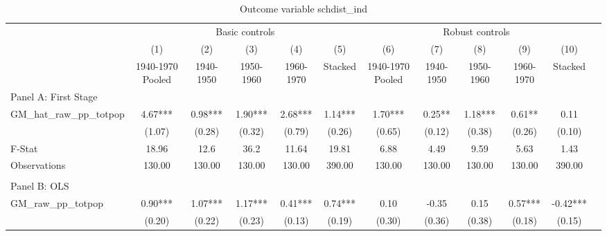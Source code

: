  \begin{table}[htbp]\centering {} \begin{threeparttable} \caption{Outcome variable schdist\_ind } \begin{tabular}{l*{11}{c}} \toprule
          &\multicolumn{5}{c}{Basic controls}                                   &\multicolumn{5}{c}{Robust controls}                                  \\\cmidrule(lr){2-6}\cmidrule(lr){7-11}
          &\multicolumn{1}{c}{(1)}&\multicolumn{1}{c}{(2)}&\multicolumn{1}{c}{(3)}&\multicolumn{1}{c}{(4)}&\multicolumn{1}{c}{(5)}&\multicolumn{1}{c}{(6)}&\multicolumn{1}{c}{(7)}&\multicolumn{1}{c}{(8)}&\multicolumn{1}{c}{(9)}&\multicolumn{1}{c}{(10)}\\
          &\multicolumn{1}{c}{1940-1970 Pooled}&\multicolumn{1}{c}{1940-1950}&\multicolumn{1}{c}{1950-1960}&\multicolumn{1}{c}{1960-1970}&\multicolumn{1}{c}{Stacked}&\multicolumn{1}{c}{1940-1970 Pooled}&\multicolumn{1}{c}{1940-1950}&\multicolumn{1}{c}{1950-1960}&\multicolumn{1}{c}{1960-1970}&\multicolumn{1}{c}{Stacked}\\
\cmidrule(lr){1-11}
\multicolumn{10}{l}{Panel A: First Stage}\\
\cmidrule(lr){1-11}
GM\_hat\_raw\_pp\_totpop&      4.67***&      0.98***&      1.90***&      2.68***&      1.14***&      1.70***&      0.25** &      1.18***&      0.61** &      0.11   \\
          &    (1.07)   &    (0.28)   &    (0.32)   &    (0.79)   &    (0.26)   &    (0.65)   &    (0.12)   &    (0.38)   &    (0.26)   &    (0.10)   \\
\midrule
F-Stat    &     18.96   &      12.6   &      36.2   &     11.64   &     19.81   &      6.88   &      4.49   &      9.59   &      5.63   &      1.43   \\
Observations&    130.00   &    130.00   &    130.00   &    130.00   &    390.00   &    130.00   &    130.00   &    130.00   &    130.00   &    390.00   \\
\cmidrule[\heavyrulewidth](lr){1-11} \\ \cmidrule[\heavyrulewidth](lr){1-11}
\multicolumn{10}{l}{Panel B: OLS}\\
\cmidrule(lr){1-11}
GM\_raw\_pp\_totpop&      0.90***&      1.07***&      1.17***&      0.41***&      0.74***&      0.10   &     -0.35   &      0.15   &      0.57***&     -0.42***\\
          &    (0.20)   &    (0.22)   &    (0.23)   &    (0.13)   &    (0.19)   &    (0.30)   &    (0.36)   &    (0.38)   &    (0.18)   &    (0.15)   \\

\end{tabular}
\end{threeparttable}
\end{table}
